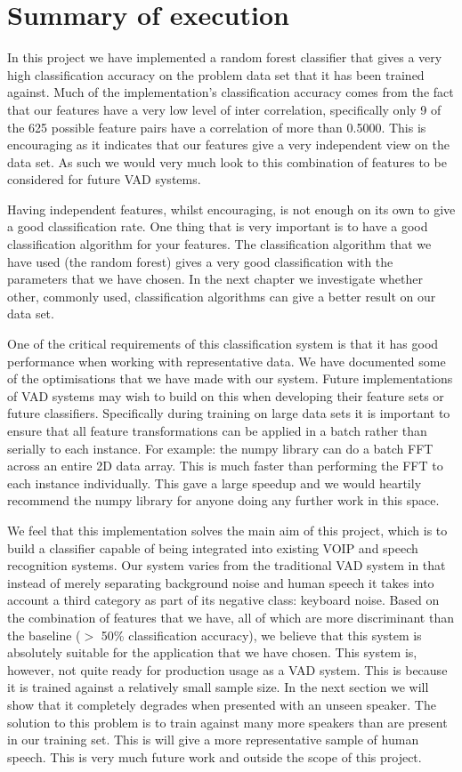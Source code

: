 \documentclass[ %
                    author={Sam Phippen},
                supervisor={Dr. Rafal Bogacz},
                     title={Real time voice activity detectors in noisy personal computing environments},
                  subtitle={},
                    degree={MEng},
                      year={2012} ]{thesis}
\begin{document}
\section{Summary of execution}

In this project we have implemented a random forest classifier that gives a
very high classification accuracy on the problem data set that it has been
trained against. Much of the implementation's classification accuracy comes
from the fact that our features have a very low level of inter correlation,
specifically only 9 of the 625 possible feature pairs have a correlation of
more than 0.5000. This is encouraging as it indicates that our features give a
very independent view on the data set. As such we would very much look to
this combination of features to be considered for future VAD systems.

Having independent features, whilst encouraging, is not enough on its own to
give a good classification rate. One thing that is very important is to have a
good classification algorithm for your features. The classification algorithm
that we have used (the random forest) gives a very good classification with the
parameters that we have chosen. In the next chapter we investigate whether
other, commonly used, classification algorithms can give a better result on our
data set.

One of the critical requirements of this classification system is that it has
good performance when working with representative data. We have documented some
of the optimisations that we have made with our system. Future implementations
of VAD systems may wish to build on this when developing their feature sets or
future classifiers. Specifically during training on large data sets it is
important to ensure that all feature transformations can be applied in a batch
rather than serially to each instance. For example: the numpy library can do a
batch FFT across an entire 2D data array. This is much faster than performing
the FFT to each instance individually. This gave a large speedup and we would
heartily recommend the numpy library for anyone doing any further work in this
space.

We feel that this implementation solves the main aim of this project, which is
to build a classifier capable of being integrated into existing VOIP and speech
recognition systems. Our system varies from the traditional VAD system in that
instead of merely separating background noise and human speech it takes into
account a third category as part of its negative class: keyboard noise.  Based
on the combination of features that we have, all of which are more discriminant
than the baseline ($>$ 50\% classification accuracy), we believe that this
system is absolutely suitable for the application that we have chosen.  This
system is, however, not quite ready for production usage as a VAD system. This
is because it is trained against a relatively small sample size. In the next
section we will show that it completely degrades when presented with an unseen
speaker. The solution to this problem is to train against many more speakers
than are present in our training set. This is will give a more representative
sample of human speech. This is very much future work and outside the scope of
this project.
\end{document}
